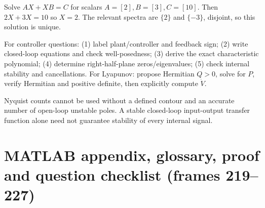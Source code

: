 \documentclass[10pt,a4paper]{article}
\begin{document}
\begin{workbox}[title={WORKED: Sylvester equation}]
Solve $AX+XB=C$ for scalars $A=[2],B=[3],C=[10]$. Then $2X+3X=10$ so $\boxed{X=2}$. The relevant spectra are $\{2\}$ and $\{-3\}$, disjoint, so this solution is unique.
\end{workbox}
\begin{exambox}For controller questions: (1) label plant/controller and feedback sign; (2) write closed-loop equations and check well-posedness; (3) derive the exact characteristic polynomial; (4) determine right-half-plane zeros/eigenvalues; (5) check internal stability and cancellations. For Lyapunov: propose Hermitian $Q>0$, solve for $P$, verify Hermitian and positive definite, then explicitly compute $\dot V$.\end{exambox}
\begin{warnbox}Nyquist counts cannot be used without a defined contour and an accurate number of open-loop unstable poles. A stable closed-loop input-output transfer function alone need not guarantee stability of every internal signal.\end{warnbox}


\section{MATLAB appendix, glossary, proof and question checklist (frames 219--227)}
\end{document}
